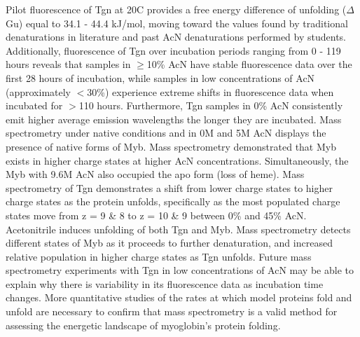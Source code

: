 {{    Pilot fluorescence of Tgn at 20{\textdegree}C provides a free energy difference of unfolding (\ensuremath{\Delta}Gu) equal to 34.1 - 44.4 kJ/mol, moving toward the values found by traditional denaturations in literature and past AcN denaturations performed by students. Additionally, fluorescence of Tgn over incubation periods ranging from 0 - 119 hours reveals that samples in \ensuremath{\geq}10\% AcN have stable fluorescence data over the first 28 hours of incubation, while samples in low concentrations of AcN (approximately \ensuremath{<}30\%) experience extreme shifts in fluorescence data when incubated for \ensuremath{>}110 hours. Furthermore, Tgn samples in 0\% AcN consistently emit higher average emission wavelengths the longer they are incubated. Mass spectrometry under native conditions and in 0M and 5M AcN displays the presence of native forms of Myb. Mass spectrometry demonstrated that Myb exists in higher charge states at higher AcN concentrations. Simultaneously, the Myb with 9.6M AcN also occupied the apo form (loss of heme). Mass spectrometry of Tgn demonstrates a shift from lower charge states to higher charge states as the protein unfolds, specifically as the most populated charge states move from z = 9 \& 8 to z = 10 \& 9 between 0\% and 45\% AcN. 
    }
    {
    Acetonitrile induces unfolding of both Tgn and Myb. Mass spectrometry detects different states of Myb as it proceeds to further denaturation, and increased relative population in higher charge states as Tgn unfolds. Future mass spectrometry experiments with Tgn in low concentrations of AcN may be able to explain why there is variability in its fluorescence data as incubation time changes. More quantitative studies of the rates at which model proteins fold and unfold are necessary to confirm that mass spectrometry is a valid method for assessing the energetic landscape of myoglobin's protein folding.
    }}

    \newpage
    